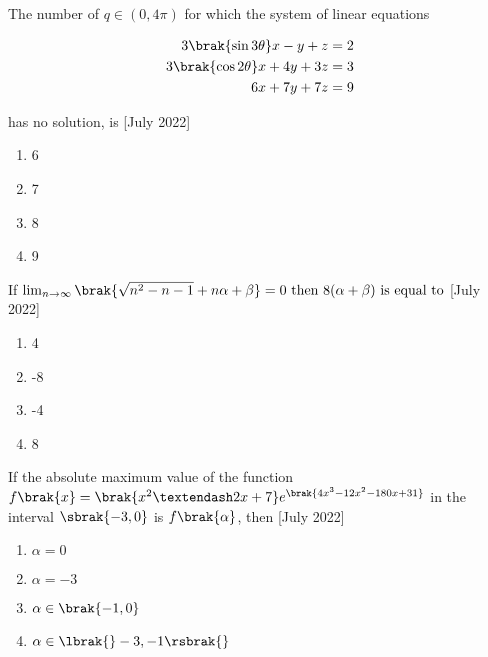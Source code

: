     \item{
     
            The number of $q \in (0, 4\pi)$ for which the system of linear equations
            
            \begin{align*}
            	3\brak{\sin 3\theta} x - y + z &= 2 \\
            	3\brak{\cos 2\theta} x + 4y + 3z &= 3 \\
            	6x + 7y + 7z &= 9
            \end{align*}
            
            has no solution, is \text{ }
            \hfill
            {[July 2022]}
            \begin{multicols}{4}
                \begin{enumerate}
                	\item 6
                	\item 7
                	\item 8
                	\item 9
                \end{enumerate}
            \end{multicols}
        
        }
    \item{
            If  $\lim_{n\rightarrow\infty}\brak{\sqrt{n^2-n-1}+n\alpha+\beta}=0 \text{ then } 8(\alpha + \beta) \text{ is equal to}$
           	\hfill
                {[July 2022]}
            
           \begin{multicols}{4}
            	\begin{enumerate}
            		\item 4
            		\item -8
            		\item -4
            		\item 8
            	\end{enumerate}
            \end{multicols}
        
        }
 	\item{
        	If the absolute maximum value of the function $f\brak{x} = \brak{x^2 – 2x + 7} e^{\brak{4x^3-12x^2-180x + 31}}$ in the interval $\sbrak{-3, 0}$ is $f\brak{\alpha}$, then
        	\hfill
        	{[July 2022]}
        	
        	\begin{multicols}{4}
        		\begin{enumerate}
        			\item $\alpha = 0$
        			\item $\alpha = -3$
        			\item $\alpha \in \brak{-1, 0}$
        			\item $\alpha \in \lbrak{}-3, -1\rsbrak{}$
        		\end{enumerate}
        	\end{multicols}
        	
        }
